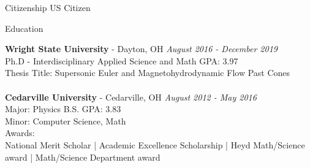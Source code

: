 \documentclass{resume} %
\begin{document}
\begin{rSection}{Citizenship}
US Citizen


\end{rSection}


\begin{rSection}{Education}

{\bf Wright State University} - Dayton, OH \hfill {\em August 2016 - December 2019} 
\\ Ph.D - Interdisciplinary Applied Science and Math \hfill {GPA: 3.97}
\\ Thesis Title: Supersonic Euler and Magnetohydrodynamic Flow Past Cones\\
\\{\bf Cedarville University} - Cedarville, OH \hfill {\em August 2012 - May 2016} 
\\ Major: Physics B.S. \hfill { GPA: 3.83 }
\\ Minor: Computer Science, Math \smallskip \\
Awards: \\ National Merit Scholar | Academic Excellence Scholarship | Heyd Math/Science award | Math/Science Department award



\end{rSection}
\end{document}
